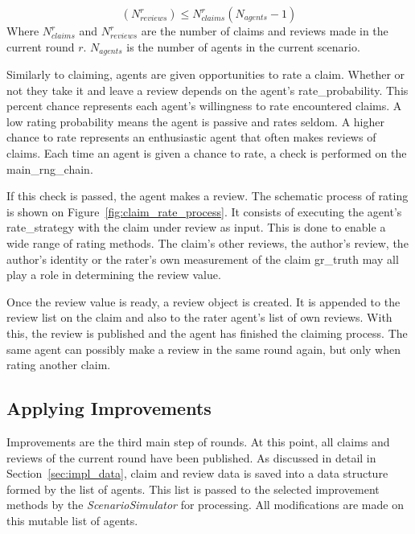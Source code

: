 \documentclass[%
    ]{\PathToTumTemplate/thesis/tum_thesis}
\begin{document}
\begin{equation}\label{eq:max_reviews}
	(N^r_{reviews}) \le N^r_{claims} (N_{agents}-1)
\end{equation}
Where $ N^r_{claims} $ and $ N^r_{reviews} $ are the number of claims and reviews made in the current round $r$.
$ N_{agents} $ is the number of agents in the current scenario.

Similarly to claiming, agents are given opportunities to rate a claim.
Whether or not they take it and leave a review depends on the agent's \gls{rate_probability}.
This percent chance represents each agent's willingness to rate encountered claims.
A low rating probability means the agent is passive and rates seldom.
A higher chance to rate represents an enthusiastic agent that often makes reviews of claims.
Each time an agent is given a chance to rate, a check is performed on the \gls{main_rng_chain}.

If this check is passed, the agent makes a review.
The schematic process of rating is shown on Figure~\ref{fig:claim_rate_process}.
It consists of executing the agent's \gls{rate_strategy} with the claim under review as input.
This is done to enable a wide range of rating methods.
The claim's other reviews, the author's review, the author's identity or the rater's own measurement of the claim \gls{gr_truth} may all play a role in determining the review value.

Once the review value is ready, a review object is created.
It is appended to the review list on the claim and also to the rater agent's list of own reviews.
With this, the review is published and the agent has finished the claiming process.
The same agent can possibly make a review in the same round again, but only when rating another claim.


\subsection{Applying Improvements}

Improvements are the third main step of rounds.
At this point, all claims and reviews of the current round have been published.
As discussed in detail in Section~\ref{sec:impl_data}, claim and review data is saved into a data structure formed by the list of agents.
This list is passed to the selected improvement methods by the \emph{ScenarioSimulator} for processing.
All modifications are made on this mutable list of agents.
\end{document}

